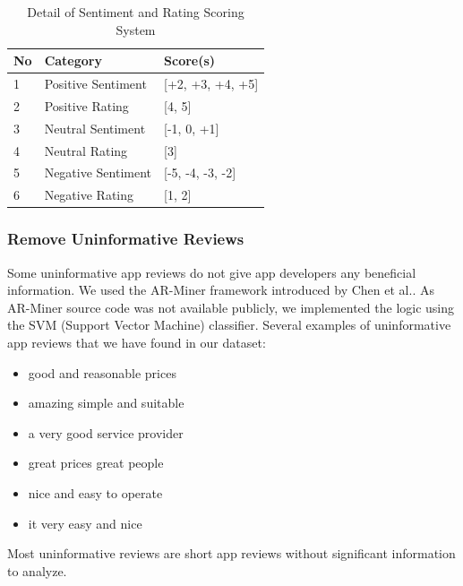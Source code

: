 \documentclass[12pt]{article}
\begin{document}
\begin{table}[!h]
\centering
\caption{Detail of Sentiment and Rating Scoring System}
\begin{tabular}{| l | l | l |}
	\hline
	\bf{No} & \bf{Category} & \bf{Score(s)} \\
	\hline
	1 & Positive Sentiment & [+2, +3, +4, +5] \\
	\hline
	2 & Positive Rating & [4, 5] \\
	\hline
	3 & Neutral Sentiment & [-1, 0, +1] \\
	\hline
	4 & Neutral Rating & [3] \\
	\hline
	5 & Negative Sentiment & [-5, -4, -3, -2] \\
	\hline
	6 & Negative Rating & [1, 2] \\
	\hline
\end{tabular}
\label{tab:statements}
\end{table}


\newpage
\subsubsection{Remove Uninformative Reviews}
Some uninformative app reviews do not give app developers any beneficial information. We used the AR-Miner framework introduced by Chen et al.\cite{arminer}. As AR-Miner source code was not available publicly, we implemented the logic using the SVM (Support Vector Machine) classifier. Several examples of uninformative app reviews that we have found in our dataset:

\begin{itemize}
\itemsep0em
\item good and reasonable prices
\item amazing simple and suitable
\item a very good service provider
\item great prices great people
\item nice and easy to operate
\item it very easy and nice
\end{itemize}

Most uninformative reviews are short app reviews without significant information to analyze.
\end{document}
